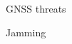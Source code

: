 \begin{section}{GNSS threats}
\begin{subsection}{Jamming}
      \end{subsection}
        

    \end{section}


